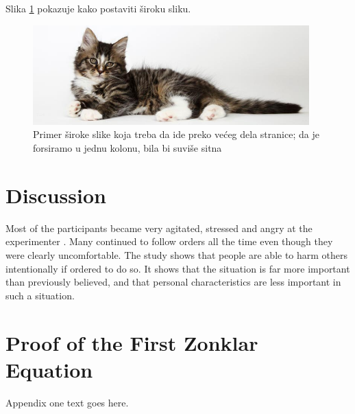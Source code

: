 \documentclass[conference]{IEEEtran}
\begin{document}
\lipsum [4-6]

Slika \ref{cicamaca} pokazuje kako postaviti široku sliku. %

\begin{figure}[!ht] 
\centering
\includegraphics[width=0.95\textwidth]{graph2.jpg}
\caption{Primer široke slike koja treba da ide preko većeg dela stranice; da je forsiramo u jednu kolonu, bila bi suviše sitna}
\label{cicamaca}
\end{figure}


\lipsum [1-4]

\section{Discussion}
\label{sec_discussion}

Most of the participants became very agitated, stressed and angry at the experimenter \cite{vrgovic2012open}. 
Many continued to follow orders all the time even though they were clearly uncomfortable. 
The study shows that people are able to harm others intentionally if ordered to do so. It 
shows that the situation is far more important than previously believed, and that personal 
characteristics are less important in such a situation. \cite{frakes1992information}

\appendices
\section{Proof of the First Zonklar Equation}
Appendix one text goes here.
\end{document}

